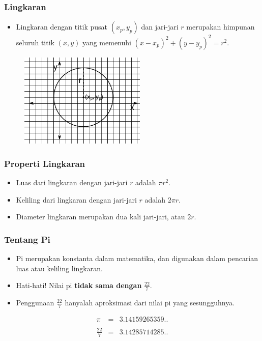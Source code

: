 \begin{frame}
\frametitle{Lingkaran}
\begin{itemize}
  \item Lingkaran dengan titik pusat $(x_p, y_p)$ dan jari-jari $r$ merupakan himpunan seluruh titik $(x, y)$ yang memenuhi $(x - x_p)^2 + (y - y_p)^2 = r^2$.
\end{itemize}
\begin{figure}
  \includegraphics[width=6cm]{asset/circle.pdf}
\end{figure}
\end{frame}

\begin{frame}
\frametitle{Properti Lingkaran}
\begin{itemize}
  \item Luas dari lingkaran dengan jari-jari $r$ adalah $\pi r^2$.
  \item Keliling dari lingkaran dengan jari-jari $r$ adalah $2\pi r$.
  \item Diameter lingkaran merupakan dua kali jari-jari, atau $2r$.
\end{itemize}
\end{frame}

\begin{frame}
\frametitle{Tentang Pi}
\begin{itemize}
  \item Pi merupakan konstanta dalam matematika, dan digunakan dalam pencarian luas atau keliling lingkaran.
  \item Hati-hati! Nilai pi \textbf{tidak sama dengan} \(\displaystyle \frac{22}{7}\).
  \item Penggunaan \(\displaystyle \frac{22}{7}\) hanyalah aproksimasi dari nilai pi yang sesungguhnya.
\end{itemize}
\begin{eqnarray*}
\pi &=& 3.14159265359.. \\
\\
\frac{22}{7} &=& 3.14285714285..
\end{eqnarray*}
\end{frame}

